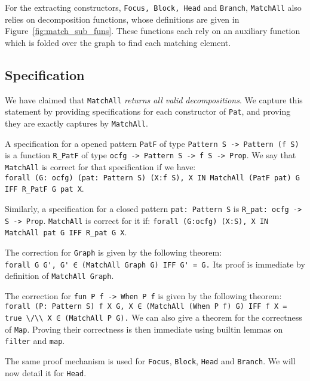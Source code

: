 \documentclass[11pt]{article}
\newcommand{\inlinecoq}[1]{\mbox{\lstinline[style=customcoq,columns=fixed,basewidth=.48em]{#1}}}
\newcommand{\ilc}[1]{\inlinecoq{#1}}
\newcommand{\yzt}[1]{\textcolor{ForestGreen!50}{#1}}
\newcommand{\pat}{\texttt{Pat}\xspace}
\begin{document}
For the extracting constructors, \ilc{Focus, Block, Head} and \ilc{Branch}, \ilc{MatchAll} also relies on decomposition functions, whose definitions are given in Figure~\ref{fig:match_sub_funs}. These functions each rely on an auxiliary function which is folded over the graph to find each matching element.

\subsection{Specification}

\yzt{We have claimed that \ilc{MatchAll} \emph{returns all valid decompositions}. We capture this statement by providing specifications for each constructor of \pat, and proving they are exactly captures by \ilc{MatchAll}.}

A specification for a opened pattern \ilc{PatF} of type \ilc{Pattern S -> Pattern (f S)} is a function \ilc{R_PatF} of type \ilc{ocfg -> Pattern S -> f S -> Prop}. We say that \ilc{MatchAll} is correct for that specification if we have:\\\ilc{forall (G: ocfg) (pat: Pattern S) (X:f S), X IN MatchAll (PatF pat) G IFF R_PatF G pat X}.

Similarly, a specification for a closed pattern \ilc{pat: Pattern S} is \ilc{R_pat: ocfg -> S -> Prop}. \ilc{MatchAll} is correct for it if: \ilc{forall (G:ocfg) (X:S), X IN MatchAll pat G IFF R_pat G X}. 

The correction for \ilc{Graph} is given by the following theorem:\\\ilc{forall G G', G' ∈ (MatchAll Graph G) IFF G' = G.} Its proof is immediate by definition of \ilc{MatchAll Graph}.

The correction for \ilc{fun P f -> When P f} is given by the following theorem:\\\ilc{forall (P: Pattern S) f X G, X ∈ (MatchAll (When P f) G) IFF f X = true \/\\ X ∈ (MatchAll P G).} We can also give a theorem for the correctness of \ilc{Map}. Proving their correctness is then immediate using builtin lemmas on \ilc{filter} and \ilc{map}.

The same proof mechanism is used for \ilc{Focus}, \ilc{Block}, \ilc{Head} and \ilc{Branch}. We will now detail it for \ilc{Head}.

\end{document}
